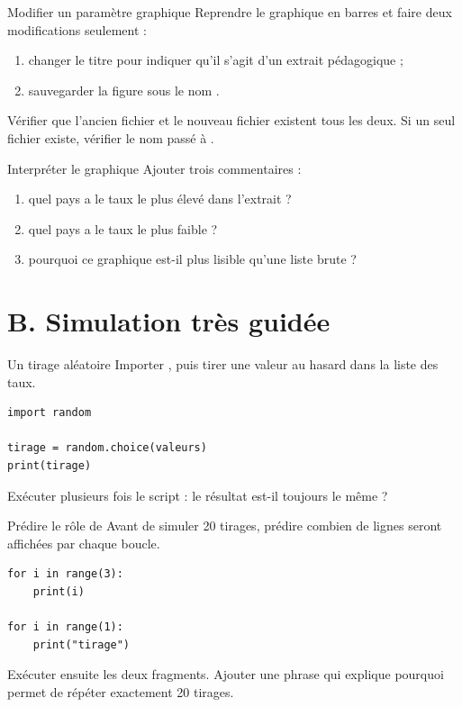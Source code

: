 \documentclass[11pt,a4paper]{article}
\begin{document}
\begin{mandatoryexercise}{Modifier un paramètre graphique}
Reprendre le graphique en barres et faire deux modifications seulement :
\begin{enumerate}
  \item changer le titre pour indiquer qu'il s'agit d'un extrait pédagogique ;
  \item sauvegarder la figure sous le nom .
\end{enumerate}
Vérifier que l'ancien fichier et le nouveau fichier existent tous les deux. Si un seul fichier existe, vérifier le nom passé à .
\end{mandatoryexercise}

\begin{mandatoryexercise}{Interpréter le graphique}
Ajouter trois commentaires :
\begin{enumerate}
  \item quel pays a le taux le plus élevé dans l'extrait ?
  \item quel pays a le taux le plus faible ?
  \item pourquoi ce graphique est-il plus lisible qu'une liste brute ?
\end{enumerate}
\end{mandatoryexercise}

\section*{B. Simulation très guidée}

\begin{mandatoryexercise}{Un tirage aléatoire}
Importer , puis tirer une valeur au hasard dans la liste des taux.
\begin{lstlisting}
import random

tirage = random.choice(valeurs)
print(tirage)
\end{lstlisting}
Exécuter plusieurs fois le script : le résultat est-il toujours le même ?
\end{mandatoryexercise}

\begin{mandatoryexercise}{Prédire le rôle de }
Avant de simuler 20 tirages, prédire combien de lignes seront affichées par chaque boucle.
\begin{lstlisting}
for i in range(3):
    print(i)

for i in range(1):
    print("tirage")
\end{lstlisting}
Exécuter ensuite les deux fragments. Ajouter une phrase qui explique pourquoi  permet de répéter exactement 20 tirages.
\end{mandatoryexercise}
\end{document}
